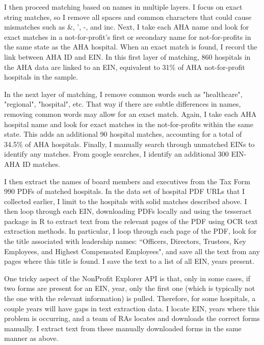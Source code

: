 \documentclass[12pt]{article}
\begin{document}
I then proceed matching based on names in multiple layers. I focus on exact string matches, so I remove all spaces and common characters that could cause mismatches such as \&, ', -, and inc. Next, I take each AHA name and look for exact matches in a not-for-profit's first or secondary name for not-for-profits in the same state as the AHA hospital. When an exact match is found, I record the link between AHA ID and EIN. In this first layer of matching, 860 hospitals in the AHA data are linked to an EIN, equivalent to 31\% of AHA not-for-profit hospitals in the sample. 

In the next layer of matching, I remove common words such as "healthcare", "regional", "hospital", etc. That way if there are subtle differences in names, removing common words may allow for an exact match. Again, I take each AHA hospital name and look for exact matches in the not-for-profits within the same state. This adds an additional 90 hospital matches, accounting for a total of 34.5\% of AHA hospitals. Finally, I manually search through unmatched EINs to identify any matches. From google searches, I identify an additional 300 EIN-AHA ID matches.

I then extract the names of board members and executives from the Tax Form 990 PDFs of matched hospitals. In the data set of hospital PDF URLs that I collected earlier, I limit to the hospitals with solid matches described above. I then loop through each EIN, downloading PDFs locally and using the tesseract package in R to extract text from the relevant pages of the PDF using OCR text extraction methods. In particular, I loop through each page of the PDF, look for the title associated with leadership names: ``Officers, Directors, Trustees, Key Employees, and Highest Compensated Employees", and save all the text from any pages where this title is found. I save the text to a list of all EIN, years present. 

One tricky aspect of the NonProfit Explorer API is that, only in some cases, if two forms are present for an EIN, year, only the first one (which is typically not the one with the relevant information) is pulled. Therefore, for some hospitals, a couple years will have gaps in text extraction data. I locate EIN, years where this problem is occurring, and a team of RAs locates and downloads the correct forms manually. I extract text from these manually downloaded forms in the same manner as above. 
\end{document}

